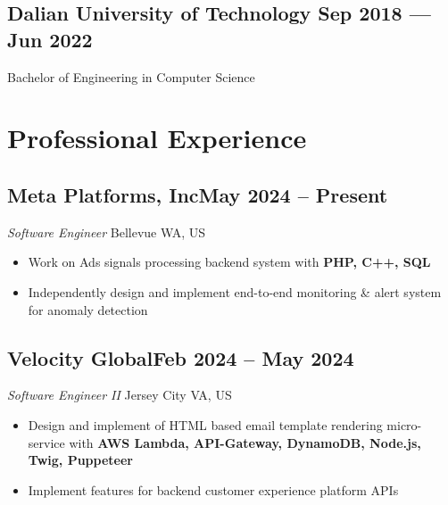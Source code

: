 \documentclass[a4,12pt]{article}
\newcommand{\subtext}[1]{
#1\par\vspace{-0.3cm}}
\newenvironment{zitemize}{
\begin{itemize}\itemsep0pt \parskip0pt \parsep1pt}
{\end{itemize}\vspace{-0.5cm}}
\begin{document}
\subsection*{Dalian University of Technology \hfill \textbf{ Sep 2018 --- Jun 2022 }}
Bachelor of Engineering in Computer Science \\


\vspace{-0.5cm}


\section{\textbf{Professional Experience}}

\vspace{-0.15cm}
\subsection*{\normalsize\textbf{Meta Platforms, Inc}\hfill May 2024 -- Present}
\subtext{\textit{Software Engineer} \hfill Bellevue WA, US}
    \begin{zitemize}
        \item Work on Ads signals processing backend system with \textbf{PHP, C++, SQL}
        \item Independently design and implement end-to-end monitoring \& alert system for anomaly detection
    \end{zitemize}

\vspace{-0.15cm}
\subsection*{\normalsize\textbf{Velocity Global}\hfill Feb 2024 -- May 2024}
\subtext{\textit{Software Engineer II} \hfill Jersey City VA, US}
    \begin{zitemize}
        \item Design and implement of HTML based email template rendering micro-service with \textbf{AWS Lambda, API-Gateway, DynamoDB, Node.js, Twig, Puppeteer}
        \item Implement features for backend customer experience platform APIs
    \end{zitemize}
        
\end{document}
